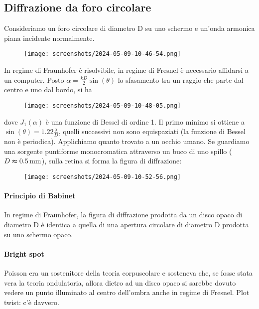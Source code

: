 \subsection{Diffrazione da foro circolare}
Consideriamo un foro circolare di diametro D su uno schermo e un'onda armonica piana incidente normalmente.
\begin{figure}[H]
	\centering
	\texttt{[image: screenshots/2024-05-09-10-46-54.png]}
\end{figure}
In regime di Fraunhofer è risolvibile, in regime di Fresnel è necessario affidarsi a un computer. Posto \(\alpha = \frac{kD}{2}\sin (\theta )\) lo sfasamento tra un raggio che parte dal centro e uno dal bordo, si ha
\begin{figure}[H]
	\centering
	\texttt{[image: screenshots/2024-05-09-10-48-05.png]}
\end{figure}
dove \(J_1(\alpha )\) è una funzione di Bessel di ordine 1. Il primo minimo si ottiene a \(\sin (\theta ) = 1.22 \frac{\lambda }{D}\), quelli successivi non sono equispaziati (la funzione di Bessel non è periodica). Applichiamo quanto trovato a un occhio umano. Se guardiamo una sorgente puntiforme monocromatica attraverso un buco di uno spillo (\(D\thickapprox \SI{0.5}{mm}\)), sulla retina si forma la figura di diffrazione:
\begin{figure}[H]
	\centering
	\texttt{[image: screenshots/2024-05-09-10-52-56.png]}
\end{figure}

\paragraph{Principio di Babinet} In regime di Fraunhofer, la figura di diffrazione prodotta da un disco opaco di diametro D è identica a quella di una apertura circolare di diametro D prodotta su uno schermo opaco.

\paragraph{Bright spot}
Poisson era un sostenitore della teoria corpuscolare e sosteneva che, se fosse stata vera la teoria ondulatoria, allora dietro ad un disco opaco si sarebbe dovuto vedere un punto illuminato al centro dell'ombra anche in regime di Fresnel. Plot twist: c'è davvero.

